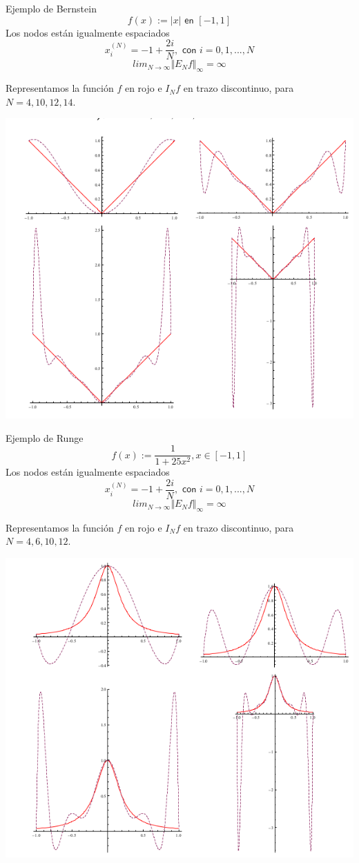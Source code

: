 \begin{ejemplo}
Ejemplo de Bernstein
\[ f(x):= \vert x \vert \textsf{ en } \left[ -1,1 \right] \]
Los nodos están igualmente espaciados
\[ x_i^{(N)} = -1+\frac{2i}{N}, \textsf{ con } i=0,1,...,N \]
\[lim_{N\rightarrow \infty } \Vert E_Nf \Vert _\infty = \infty \]

Representamos la función $f$ en rojo e $I_Nf$ en trazo discontinuo, para $N=4,10,12,14$.

\includegraphics[scale=0.3]{media/Bernstein.png}
\end{ejemplo}

\begin{ejemplo}
Ejemplo de Runge
\[ f(x) := \frac{1}{1+25x^2}, x \in \left[ -1,1 \right] \]
Los nodos están igualmente espaciados
\[ x_i^{(N)} = -1+\frac{2i}{N}, \textsf{ con } i=0,1,...,N \]
\[ lim_{N\rightarrow \infty } \Vert E_Nf \Vert _\infty = \infty \]

Representamos la función $f$ en rojo e $I_Nf$ en trazo discontinuo, para $N=4,6,10,12$.

\includegraphics[scale=0.3]{media/Runge.png}
\end{ejemplo}

